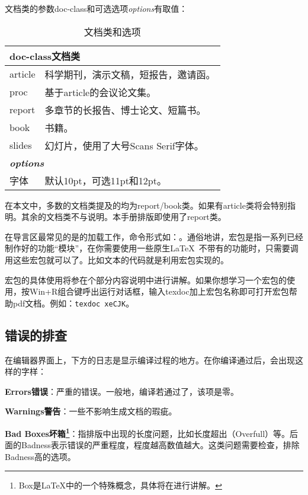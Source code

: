 文档类的参数doc-class和可选选项{\textit{options}}有取值：%
	\begin{table}[!htb]
	\centering
	\caption{文档类和选项}
	\label{tab:documentclass}
	\begin{tabular}{p{5em} @{\ -\ } p{24em}}
		\hline
		\multicolumn{2}{l}{\bfseries doc-class文档类\footnotemark}\\
		\hline
		article & 科学期刊，演示文稿，短报告，邀请函。\\
		proc	& 基于article的会议论文集。\\
		report	& 多章节的长报告、博士论文、短篇书。\\
		book	& 书籍。\\
		slides	& 幻灯片，使用了大号Scans Serif字体。\\
		\hline
		\multicolumn{2}{l}{\bfseries\itshape options}\\
		\hline
		字体	&默认10pt，可选11pt和12pt。\\
		\hline
	\end{tabular}
\end{table}

在本文中，多数的文档类提及的均为report/book类。如果有article类将会特别指明。其余的文档类不与说明。本手册排版即使用了report类。

在导言区最常见的是的加载工作，命令形式如：。通俗地讲，宏包是指一系列已经制作好的功能``模块''，在你需要使用一些原生\LaTeX\ 不带有的功能时，只需要调用这些宏包就可以了。比如文本的代码就是利用宏包实现的。

宏包的具体使用将参在个部分内容说明中进行讲解。如果你想学习一个宏包的使用，按Win+R组合键呼出运行对话框，输入texdoc加上宏包名称即可打开宏包帮助pdf文档。例如：\verb|texdoc xeCJK|。

\subsection{错误的排查}
	\label{subsec:debug}
	在编辑器界面上，下方的日志是显示编译过程的地方。在你编译通过后，会出现这样的字样：
\begin{feai}
	\item {\bfseries{Errors错误}}：严重的错误。一般地，编译若通过了，该项是零。
	\item {\bfseries{Warnings警告}}：一些不影响生成文档的瑕疵。
	\item {\bfseries{Bad Boxes坏箱}\footnote{Box是\LaTeX{}中的一个特殊概念，具体将在进行讲解。}}：指排版中出现的长度问题，比如长度超出（Overfull）等。后面的Badness表示错误的严重程度，程度越高数值越大。这类问题需要检查，排除Badness高的选项。\marginpar{\textcolor{red!70}{此处注解在后续章节，目前未链接}}
\end{feai}

